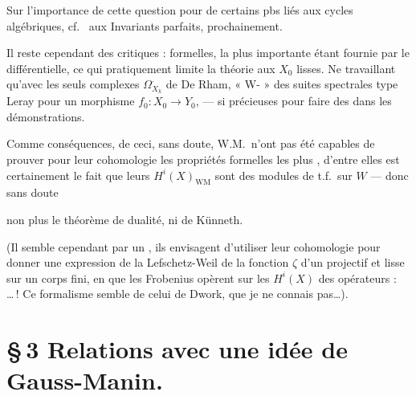 \documentclass[11pt,a4paper]{article}
\begin{document}
Sur l'importance de cette question \struck{\ill{}} pour \ill{} de
certains pbs liés aux  cycles algébriques, cf.\ \ill{} \ill{} aux Invariants
\add{[~]} \ill{} parfaits, prochainement.


Il reste cependant des  critiques : formelles, la plus
importante étant \ill{} \ill{} \ill{} fournie par le différentielle, ce qui pratiquement limite la
théorie aux $X_0$ lisses. Ne \struck{\ill{}} travaillant qu'avec les seuls
complexes $\Omega^{\cdot}_{X_k}$ de  De Rham,
  « W-\ill{} »
  des suites spectrales
 type Leray pour un morphisme $f_0 : X_0 \to Y_0$, --- si
précieuses pour faire des  dans les démonstrations.

Comme conséquences, de  ceci, sans doute, W.M.\ n'ont pas été
capables de prouver pour leur cohomologie les \struck{\ill{}}
propriétés formelles les plus , \ill{} \ill{}
\ill{} d'entre elles est certainement le fait que leurs
$H^{i}(X)_{\mathrm{WM}}$ sont des modules de t.f.\ sur $W$ --- donc sans
doute


non plus le théorème de dualité, ni de Künneth. 

(Il semble cependant \ill{} par un \ill{}, ils envisagent d'utiliser leur
cohomologie pour donner une expression de la 
Lefschetz-Weil de la fonction $\zeta$ d'un  projectif
et lisse sur un corps fini, en \ill{} que les Frobenius opèrent sur les
$H^{i}(X)$ \ill{} des opérateurs : \ill{} \ill{}\ldots\,! Ce formalisme
semble \ill{} \ill{} de celui de Dwork, que je ne connais pas\ldots).

\section*{§\,3  Relations  avec une
idée de Gauss-Manin.}
\end{document}
